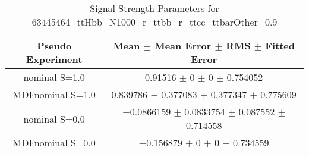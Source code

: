 \begin{table}
\centering
\caption{Signal Strength Parameters for 63445464\_ttHbb\_N1000\_r\_ttbb\_r\_ttcc\_ttbarOther\_0.9}
\begin{tabular}{cc}
\toprule
Pseudo Experiment & Mean $\pm$ Mean Error $\pm$ RMS $\pm$ Fitted Error\\
\midrule
nominal S=1.0 & \num{0.91516} $\pm$ \num{0} $\pm$ \num{0} $\pm$ \num{0.754052}\\
MDFnominal S=1.0 & \num{0.839786} $\pm$ \num{0.377083} $\pm$ \num{0.377347} $\pm$ \num{0.775609}\\
nominal S=0.0 & \num{-0.0866159} $\pm$ \num{0.0833754} $\pm$ \num{0.087552} $\pm$ \num{0.714558}\\
MDFnominal S=0.0 & \num{-0.156879} $\pm$ \num{0} $\pm$ \num{0} $\pm$ \num{0.734559}\\
\bottomrule
\end{tabular}
\end{table}
